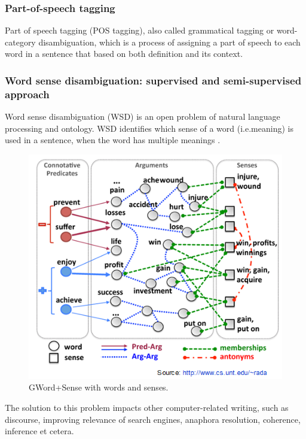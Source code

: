 \subsubsection*{Part-of-speech tagging}

Part of speech tagging (POS tagging), also called grammatical tagging or word-category disambiguation, which is a process of assigning a part of speech to each word in a sentence that based on both definition and its context.\\

\subsubsection*{Word sense disambiguation: supervised and semi-supervised approach}

Word sense disambiguation (WSD) is an open problem of natural language processing and ontology. 
WSD identifies which sense of a word (i.e.meaning) is used in a sentence,
when the word has multiple meanings \cite{Du2013}. 

\begin{figure}[tbh]
	\begin{center}
		\includegraphics[width=\columnwidth]{Union_Background_Chart_WSD}
	\end{center}
	\caption{GWord+Sense with words and senses. \label{fig1}}
\end{figure}

The solution to this problem impacts other computer-related writing, such as discourse, 
improving relevance of search engines, anaphora resolution, coherence, inference et cetera.

